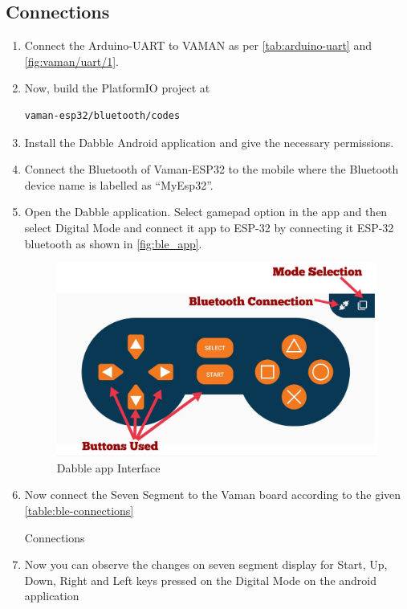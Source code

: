 \subsection{Connections}
\begin{enumerate}
\item Connect the Arduino-UART to VAMAN as per \autoref{tab:arduino-uart} and
\autoref{fig:vaman/uart/1}.
\item Now, build the PlatformIO project at
\begin{lstlisting}
vaman-esp32/bluetooth/codes
\end{lstlisting}
\item Install the Dabble Android application and give the necessary permissions.
\item Connect the Bluetooth of Vaman-ESP32 to the mobile where the Bluetooth
device name is labelled as ``MyEsp32''.
\item Open the Dabble application. Select gamepad option in the app and then
select Digital Mode and connect it app to ESP-32 by connecting it ESP-32
bluetooth as shown in \autoref{fig:ble_app}.
\begin{figure}[!ht]
\centering
\includegraphics[width=\columnwidth]{vaman-esp32/bluetooth/figs/ble_app.jpg}
\caption{Dabble app Interface}
\label{fig:ble_app}
\end{figure}
\item Now connect the Seven Segment to the Vaman board according to the given
\autoref{table:ble-connections}
\begin{table}[!ht]
\centering

\caption{Connections}
\label{table:ble-connections}
\end{table}
\item Now you can observe the changes on seven segment display for Start, Up,
Down, Right and Left keys pressed on the Digital Mode on the android application
\end{enumerate}
